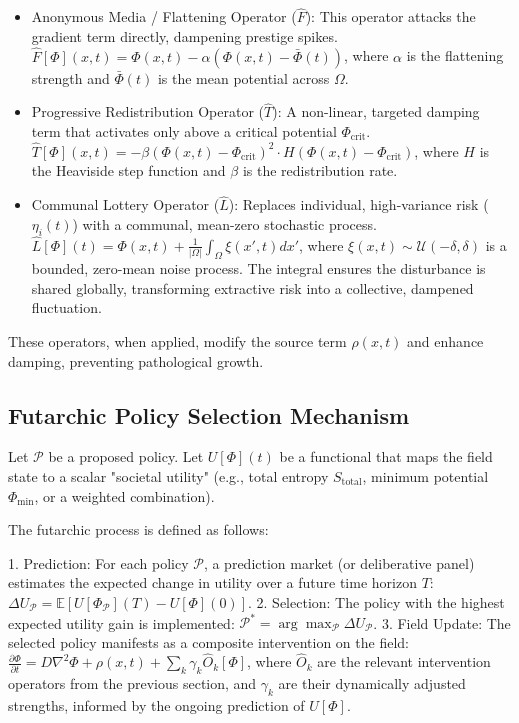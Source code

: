 \documentclass[11pt]{article}
\begin{document}
\begin{itemize}
\item Anonymous Media / Flattening Operator ($\hat{F}$): This operator attacks the gradient term directly, dampening prestige spikes. $\hat{F}[\Phi](x, t) = \Phi(x, t) - \alpha \left( \Phi(x, t) - \bar{\Phi}(t) \right)$, where $\alpha$ is the flattening strength and $\bar{\Phi}(t)$ is the mean potential across $\Omega$.
\item Progressive Redistribution Operator ($\hat{T}$): A non-linear, targeted damping term that activates only above a critical potential $\Phi_{\text{crit}}$. $\hat{T}[\Phi](x, t) = -\beta \left( \Phi(x, t) - \Phi_{\text{crit}} \right)^2 \cdot H\left( \Phi(x, t) - \Phi_{\text{crit}} \right)$, where $H$ is the Heaviside step function and $\beta$ is the redistribution rate.
\item Communal Lottery Operator ($\hat{L}$): Replaces individual, high-variance risk ($\eta_i(t)$) with a communal, mean-zero stochastic process. $\hat{L}[\Phi](t) = \Phi(x, t) + \frac{1}{|\Omega|} \int_{\Omega} \xi(x', t)  dx'$, where $\xi(x, t) \sim \mathcal{U}(-\delta, \delta)$ is a bounded, zero-mean noise process. The integral ensures the disturbance is shared globally, transforming extractive risk into a collective, dampened fluctuation.
\end{itemize}

These operators, when applied, modify the source term $\rho(x, t)$ and enhance damping, preventing pathological growth.

\subsection{Futarchic Policy Selection Mechanism}

Let $\mathcal{P}$ be a proposed policy. Let $U[\Phi](t)$ be a functional that maps the field state to a scalar "societal utility" (e.g., total entropy $S_{\text{total}}$, minimum potential $\Phi_{\text{min}}$, or a weighted combination).

The futarchic process is defined as follows:

1. Prediction: For each policy $\mathcal{P}$, a prediction market (or deliberative panel) estimates the expected change in utility over a future time horizon $T$: $\Delta U_{\mathcal{P}} = \mathbb{E}\left[ U[\Phi_{\mathcal{P}}](T) - U[\Phi](0) \right]$.
2. Selection: The policy with the highest expected utility gain is implemented: $\mathcal{P}^* = \arg \max_{\mathcal{P}} \Delta U_{\mathcal{P}}$.
3. Field Update: The selected policy manifests as a composite intervention on the field: $\frac{\partial \Phi}{\partial t} = D \nabla^2 \Phi + \rho(x, t) + \sum_{k} \gamma_k \hat{O}_k[\Phi]$, where $\hat{O}_k$ are the relevant intervention operators from the previous section, and $\gamma_k$ are their dynamically adjusted strengths, informed by the ongoing prediction of $U[\Phi]$.
\end{document}
